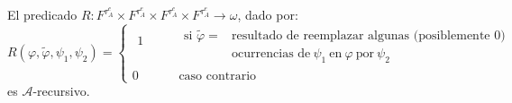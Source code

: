   \begin{lemma} \label{lemma_101}
    \PN El predicado $R: F^{\tau_{A}^{e}} \times F^{\tau_{A}^{e}} \times F^{\tau_{A}^{e}} \times F^{\tau_{A}^{e}}
    \rightarrow \omega$, dado por:
    \[
      R(\varphi, \tilde{\varphi}, \psi_{1}, \psi_{2}) = \left\{\begin{array}{cccl}
                                                                \begin{array}{c}
                                                                  1 \\
                                                                  \ \\
                                                                \end{array}
                                                                &&&
                                                                \begin{array}{cl}
                                                                  \text{si } \tilde{\varphi} = &\text{resultado de
                                                                    reemplazar algunas (posiblemente 0)} \\
                                                                  &\text{ocurrencias de} \ \psi_{1} \ \text{en} \
                                                                    \varphi \ \text{por} \ \psi_{2}
                                                                \end{array} \\ 0 &&& \text{caso contrario}
                                                              \end{array}\right.
    \]
    \PN es $\mathcal{A}$-recursivo.
  \end{lemma}
